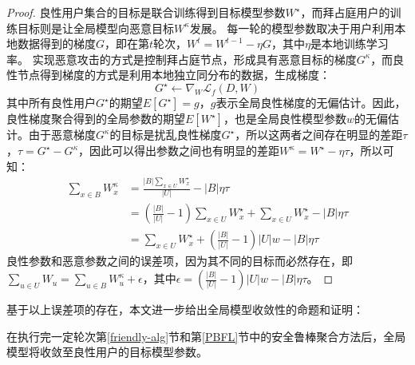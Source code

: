 \begin{proof}
	良性用户集合的目标是联合训练得到目标模型参数$W^{\star}$，而拜占庭用户的训练目标则是让全局模型向恶意目标$W^{\kappa}$发展。
	每一轮的模型参数取决于用户利用本地数据得到的梯度$G$，即在第$t$轮次，$W^{t} = W^{t-1} - \eta G$，其中$ \eta $是本地训练学习率。
	实现恶意攻击的方式是控制拜占庭节点，形成具有恶意目标的梯度$G^{\kappa}$，而良性节点得到梯度的方式是利用本地独立同分布的数据，生成梯度：
	$$
		G^{\star} \leftarrow \nabla_{W} \mathcal{L}_{f}(D,W)
	$$
	其中所有良性用户$G^{\star}$的期望$E[G^{\star}]=g$，$g$表示全局良性梯度的无偏估计。因此，良性梯度聚合得到的全局参数的期望$E[W^{\star}]$，也是全局良性模型参数$w$的无偏估计。由于恶意梯度$G^{\kappa}$的目标是扰乱良性梯度$G^{\star}$，所以这两者之间存在明显的差距$\tau$，$\tau = G^{\star}-G^{\kappa}$，因此可以得出参数之间也有明显的差距$W^{\kappa} = W^{\star} - \eta \tau$，所以可知：
	\begin{align*}
		\sum_{x\in B}W_x^{\kappa} & = \frac{|B|\sum_{x\in U}W_x^{\star}}{|U|} - |B|\eta\tau                                \\
		& = (\frac{|B|}{|U|}-1)\sum_{x\in U}W_x^{\star} + \sum_{x\in U}W_x^{\star} - |B|\eta\tau \\
		& = \sum_{x\in U}W_x^{\star} + (\frac{|B|}{|U|}-1)|U|w - |B|\eta\tau
	\end{align*}
	良性参数和恶意参数之间的误差项，因为其不同的目标而必然存在，即$\sum_{u\in U}W_u=   \sum_{u\in B}W_u^{\kappa} + \epsilon$，其中$ \epsilon = (\frac{|B|}{|U|}-1)|U|w - |B|\eta\tau $。
\end{proof}

基于以上误差项的存在，本文进一步给出全局模型收敛性的命题和证明：
\begin{proposition}[收敛性]
	在执行完一定轮次第\ref{friendly-alg}节和第\ref{PBFL}节中的安全鲁棒聚合方法后，全局模型将收敛至良性用户的目标模型参数。
\end{proposition}

